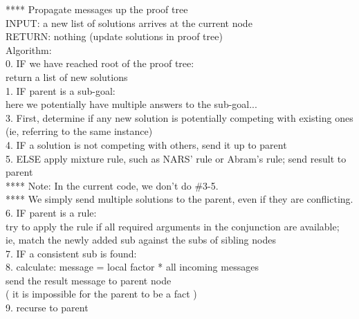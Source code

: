 **** Propagate messages up the proof tree\\
INPUT:   a new list of solutions arrives at the current node\\
RETURN:  nothing (update solutions in proof tree)\\
Algorithm:\\
0.  IF  we have reached root of the proof tree:\\
\tab    return a list of new solutions\\
1.  IF  parent is a sub-goal:\\
\tab    here we potentially have multiple answers to the sub-goal...\\
3.  First, determine if any new solution is potentially competing with existing ones\\
\tab   (ie, referring to the same instance)\\
4. IF       a solution is not competing with others, send it up to parent\\
5. ELSE apply mixture rule, such as NARS' rule or Abram's rule;  send result to parent\\
**** Note:  In the current code, we don't do \#3-5.\\
****        We simply send multiple solutions to the parent, even if they are conflicting.\\
6. IF  parent is a rule:\\
%
%
\tab try to apply the rule if all required arguments in the conjunction are available;\\
\tab ie, match the newly added sub against the subs of sibling nodes\\
7. IF  a consistent sub is found:\\
8. calculate:  message = local factor * all incoming messages\\
\tab send the result message to parent node\\
\tab ( it is impossible for the parent to be a fact ) \\
9. recurse to parent

